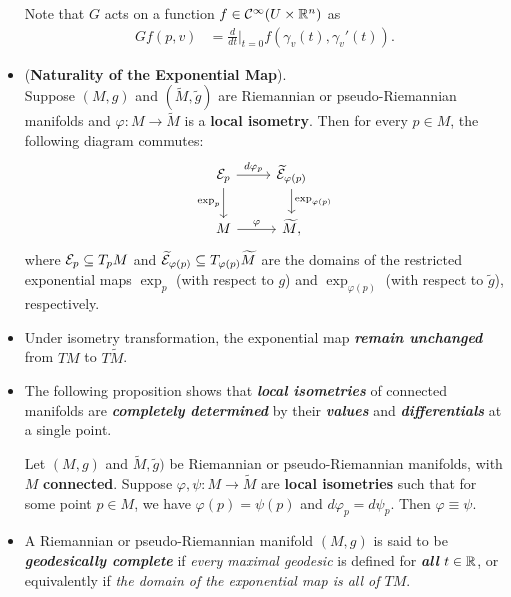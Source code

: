\documentclass[11pt]{article}
\begin{document}
\begin{itemize}
\begin{remark}
Note that $G$ acts on a function $f \in {\mathcal C}^{\infty}(U \times {\mathbb R}^n)$ as
\begin{align}
Gf(p, v) &= \frac{d}{dt}\Bigr|_{t=0}f(\gamma_v(t), \gamma_v'(t)). \label{eqn: geodesic_vector_field_act_function}
\end{align}
\end{remark}

\item \begin{proposition} (\textbf{Naturality of the Exponential Map}). \\
Suppose $(M, g)$ and $(\widetilde{M},\widetilde{g})$ are Riemannian or pseudo-Riemannian manifolds and $\varphi: M \rightarrow \widetilde{M}$ is a \textbf{local isometry}. Then for every $p \in M$, the following diagram commutes:
\[
  \begin{tikzcd}
    \cE_{p} \arrow{r}{d\varphi_p} \arrow[swap]{d}{\exp_p} & \widetilde{\cE}_{\varphi(p)} \arrow{d}{\exp_{\varphi(p)}} \\
    M \arrow{r}{\varphi} & \widetilde{M},
  \end{tikzcd}
\] where ${\mathcal E}_p \subseteq T_{p}M$ and $ \widetilde{{\mathcal E}}_{\varphi(p)} \subseteq T_{\varphi(p)}\widetilde{M}$ are the domains of the restricted exponential maps $\exp_p$ (with respect to $g$) and $\exp_{\varphi(p)}$ (with respect to $\tilde{g}$), respectively.
\end{proposition}

\item \begin{remark}
Under isometry transformation, the exponential map \emph{\textbf{remain unchanged}} from $TM$ to $T\widetilde{M}$.
\end{remark}

\item The following proposition shows that \emph{\textbf{local isometries}} of connected manifolds are \emph{\textbf{completely determined}} by their \emph{\textbf{values}} and \emph{\textbf{differentials}} at a single point.
\begin{proposition}
Let $(M, g)$ and $\widetilde{M},\widetilde{g})$ be Riemannian or pseudo-Riemannian manifolds, with $M$ \textbf{connected}. Suppose $\varphi, \psi: M \rightarrow \widetilde{M}$ are \textbf{local isometries} such that for some point $p \in M$, we have $\varphi(p) = \psi(p)$ and $d\varphi_p = d\psi_p$. Then $\varphi \equiv \psi$.
\end{proposition}

\item \begin{definition}
A Riemannian or pseudo-Riemannian manifold  $(M, g)$ is said to be \emph{\textbf{geodesically complete}} if \emph{every maximal geodesic} is defined for \emph{\textbf{all}} $t \in {\mathbb R}$, or equivalently if \emph{the domain of the exponential map is all of $TM$}. 
\end{definition}
\end{itemize}
\end{document}
